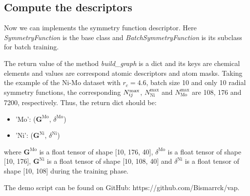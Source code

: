 \documentclass[preprint]{revtex4-2}
\begin{document}
% 
%
\subsection{Compute the descriptors}

Now we can implements the symmetry function descriptor. Here 
\textit{SymmetryFunction} is the base class and \textit{BatchSymmetryFunction} 
is its subclass for batch training.

The return value of the method \textit{build\_graph} is a dict and its keys are
chemical elements and values are correspond atomic descriptors and atom masks. 
Taking the example of the Ni-Mo dataset with $r_c = 4.6$, batch size 10 and only
10 radial symmetry functions, the corresponding $N_{ij}^{\mathrm{max}}$, 
$N_{\mathrm{Ni}}^{\mathrm{max}}$ and $N_{\mathrm{Mo}}^{\mathrm{max}}$ are 108, 
176 and 7200, respectively. Thus, the return dict should be:
\begin{itemize}
    \item \textmd{'Mo'}: ($\mathbf{G}^{\mathrm{Mo}}$, $\delta^{\mathrm{Mo}}$)
    \item \textmd{'Ni'}: ($\mathbf{G}^{\mathrm{Ni}}$, $\delta^{\mathrm{Ni}}$)
\end{itemize}
where $\mathbf{G}^{\mathrm{Mo}}$ is a float tensor of shape 
\textmd{[10, 176, 40]}, $\delta^{\mathrm{Mo}}$ is a float tensor of shape  
\textmd{[10, 176]}, $\mathbf{G}^{\mathrm{Ni}}$ is a float tensor of shape 
\textmd{[10, 108, 40]} and $\delta^{\mathrm{Ni}}$ is a float tensor of shape  
\textmd{[10, 108]} during the training phase. 

The demo script can be found on GitHub: https://github.com/Bismarrck/vap.
\end{document}
